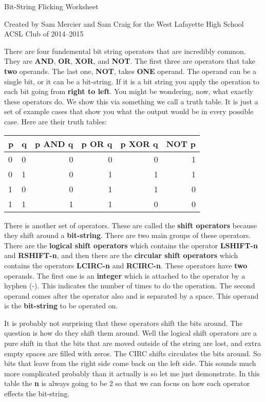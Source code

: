 \documentclass[12pt,letterpaper]{article}
\begin{document}
\begin{center}
  Bit-String Flicking Worksheet

  Created by Sam Mercier and Sam Craig for the West Lafayette High School ACSL Club of 2014--2015
\end{center}

There are four fundemental bit string operators that are incredibly common.
They are \textbf{AND}, \textbf{OR}, \textbf{XOR}, and \textbf{NOT}.
The first three are operators that take \textbf{two} operands.
The last one, \textbf{NOT}, takes \textbf{ONE} operand.
The operand can be a single bit, or it can be a bit-string.
If it is a bit string you apply the operation to each bit going from \textbf{right to left}.
You might be wondering, now, what exactly these operators do.
We show this via something we call a truth table.
It is just a set of example cases that show you what the output would be in every possible case. Here are their truth tables:

\begin{center}
  \begin{tabular}{| l | l || r | r | r | r |}
    \hline
    p & q & p \textbf{AND} q & p \textbf{OR} q & p \textbf{XOR} q & \textbf{NOT} p \\
    \hline \hline
    0 & 0 & 0 & 0 & 0 & 1 \\
    0 & 1 & 0 & 1 & 1 & 1 \\
    1 & 0 & 0 & 1 & 1 & 0 \\
    1 & 1 & 1 & 1 & 0 & 0 \\
    \hline
  \end{tabular}
\end{center}

There is another set of operators.
These are called the \textbf{shift operators} because they shift around a \textbf{bit-string}.
There are two main groups of these operators.
There are the \textbf{logical shift operators} which contains the operator \textbf{LSHIFT-n} and \textbf{RSHIFT-n}, and then there are the \textbf{circular shift operators} which contains the operators \textbf{LCIRC-n} and \textbf{RCIRC-n}.
These operators have \textbf{two} operands.
The first one is an \textbf{integer} which is attached to the operator by a hyphen (-).
This indicates the number of times to do the operation.
The second operand comes after the operator also and is separated by a space.
This operand is the \textbf{bit-string} to be operated on.

It is probably not surprising that these operators shift the bits around.
The question is how do they shift them around.
Well the logical shift operators are a pure shift in that the bits that are moved outside of the string are lost, and extra empty spaces are filled with zeros.
The CIRC shifts circulates the bits around.
So bits that leave from the right side come back on the left side.
This sounds much more complicated probably than it actually is so let me just demonstrate.
In this table the \textbf{n} is always going to be 2 so that we can focus on how each operator effects the bit-string.
\end{document}
